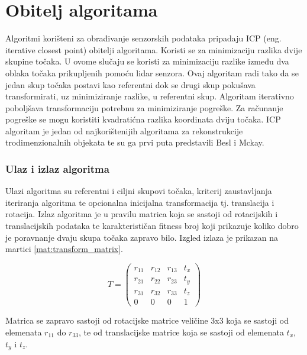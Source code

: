 \section{Obitelj algoritama}

Algoritmi korišteni za obrađivanje senzorskih podataka pripadaju ICP\cite{wiki:Iterative_closest_point} (eng. iterative closest point) obitelji algoritama. Koristi se za minimizaciju razlika dvije skupine točaka. U ovome slučaju se koristi za minimizaciju razlike između dva oblaka točaka prikupljenih pomoću lidar senzora. Ovaj algoritam radi tako da se jedan skup točaka postavi kao referentni dok se drugi skup pokušava transformirati, uz minimiziranje razlike, u referentni skup. Algoritam iterativno poboljšava transformaciju potrebnu za minimiziranje pogreške. Za računanje pogreške se mogu koristiti kvadratićna razlika koordinata dviju točaka. ICP algoritam je jedan od najkorištenijih algoritama za rekonstrukcije trodimenzionalnih objekata te su ga prvi puta predstavili Besl i Mckay\cite{beslmckay121791}.

\subsubsection{Ulaz i izlaz algoritma}

Ulazi algoritma su referentni i ciljni skupovi točaka, kriterij zaustavljanja iteriranja algoritma te opcionalna inicijalna transformacija tj. translacija i rotacija. Izlaz algoritma je u pravilu matrica koja se sastoji od rotacijskih i translacijskih podataka te karakterističan fitness broj koji prikazuje koliko dobro je poravnanje dvaju skupa točaka zapravo bilo. Izgled izlaza je prikazan na martici \ref{mat:transform_matrix}.

\begin{equation}
  T =
  \begin{pmatrix}
    r_{11} & r_{12} & r_{13} & t_{x}\\
    r_{21} & r_{22} & r_{23} & t_{y}\\
    r_{31} & r_{32} & r_{33} & t_{z}\\
    0      & 0      & 0      & 1
  \end{pmatrix}
  \label{mat:transform_matrix}
\end{equation}

Matrica se zapravo sastoji od rotacijske matrice veličine 3x3 koja se sastoji od elemenata $r_{11}$ do $r_{33}$, te od translacijske matrice koja se sastoji od elemenata $t_{x}$, $t_{y}$ i $t_{z}$. 
\pagebreak

